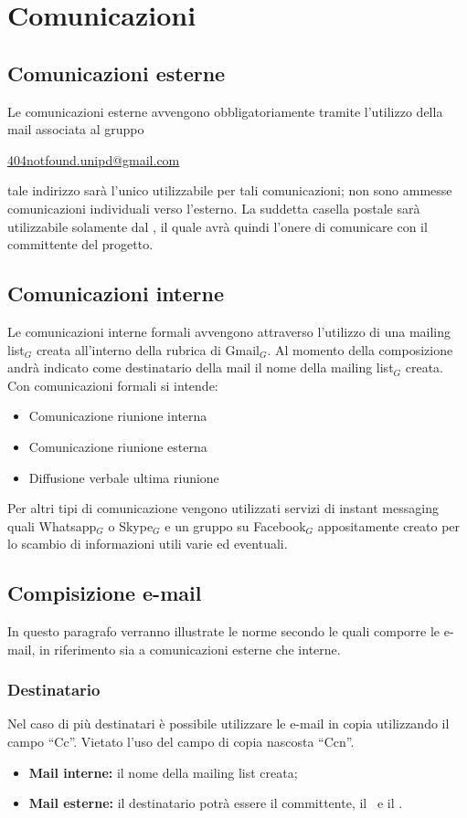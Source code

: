 \section{Comunicazioni}
\subsection{Comunicazioni esterne}
Le comunicazioni esterne avvengono obbligatoriamente tramite l’utilizzo della mail associata al gruppo
\begin{center} \href{mailto:404notfound.unipd@gmail.com}{404notfound.unipd@gmail.com}
\end{center}
tale indirizzo sarà l’unico utilizzabile per tali comunicazioni; non sono ammesse comunicazioni individuali verso l’esterno.
La suddetta casella postale sarà utilizzabile solamente dal \ruoloResponsabile, il quale avrà quindi l’onere di comunicare con il committente del progetto.

\subsection{Comunicazioni interne}
Le comunicazioni interne formali avvengono attraverso l’utilizzo di una mailing list$_{G}$ creata all'interno della rubrica di Gmail$_{G}$. Al momento della composizione andrà indicato come destinatario della mail il nome della mailing list$_{G}$ creata.
Con comunicazioni formali si intende:
\begin{itemize}
	\item Comunicazione riunione interna
	\item Comunicazione riunione esterna
	\item Diffusione verbale ultima riunione
\end{itemize}

Per altri tipi di comunicazione vengono utilizzati servizi di instant messaging quali Whatsapp$_{G}$ o Skype$_{G}$ e un gruppo su Facebook$_{G}$ appositamente creato per lo scambio di informazioni utili varie ed eventuali.

\subsection{Compisizione e-mail}
In questo paragrafo verranno illustrate le norme secondo le quali comporre le e-mail, in riferimento sia a comunicazioni esterne che interne.

\subsubsection{Destinatario}
Nel caso di più destinatari è possibile utilizzare le e-mail in copia utilizzando il campo ``Cc''. Vietato l'uso del campo di copia nascosta ``Ccn''.
\begin{itemize}
	\item \textbf{Mail interne:} il nome della mailing list creata;
	\item \textbf{Mail esterne:} il destinatario potrà essere il committente, il \Vardanega\ e il \Cardin.
\end{itemize}

